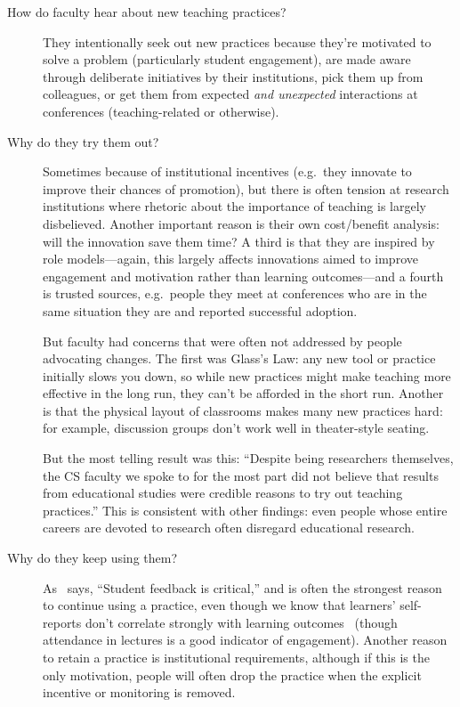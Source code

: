 \begin{description}

\item[How do faculty hear about new teaching practices?]
  They intentionally seek out new practices
  because they're motivated to solve a problem (particularly student engagement),
  are made aware through deliberate initiatives by their institutions,
  pick them up from colleagues,
  or get them from expected \emph{and unexpected} interactions at conferences
  (teaching-related or otherwise).

\item[Why do they try them out?]
  Sometimes because of institutional incentives
  (e.g.\ they innovate to improve their chances of promotion),
  but there is often tension at research institutions
  where rhetoric about the importance of teaching is largely disbelieved.
  Another important reason is their own cost/benefit analysis:
  will the innovation save them time?
  A third is that they are inspired by role models---again,
  this largely affects innovations aimed to improve engagement and motivation
  rather than learning outcomes---and a fourth is trusted sources,
  e.g.\ people they meet at conferences who are in the same situation they are
  and reported successful adoption.

  But faculty had concerns that were often not addressed by people advocating changes.
  The first was Glass's Law:
  any new tool or practice initially slows you down,
  so while new practices might make teaching more effective in the long run,
  they can't be afforded in the short run.
  Another is that the physical layout of classrooms makes many new practices hard:
  for example,
  discussion groups don't work well in theater-style seating.

  But the most telling result was this:
  ``Despite being researchers themselves,
  the CS faculty we spoke to for the most part did not believe that
  results from educational studies were credible reasons to try out teaching practices.''
  This is consistent with other findings:
  even people whose entire careers are devoted to research often disregard educational research.

\item[Why do they keep using them?]
  As~\cite{Bark2015} says, ``Student feedback is critical,''
  and is often the strongest reason to continue using a practice,
  even though we know that learners' self-reports don't correlate strongly with learning outcomes~\cite{Star2014,Uttl2017}
  (though attendance in lectures is a good indicator of engagement).
  Another reason to retain a practice is institutional requirements,
  although if this is the only motivation,
  people will often drop the practice
  when the explicit incentive or monitoring is removed.

\end{description}

